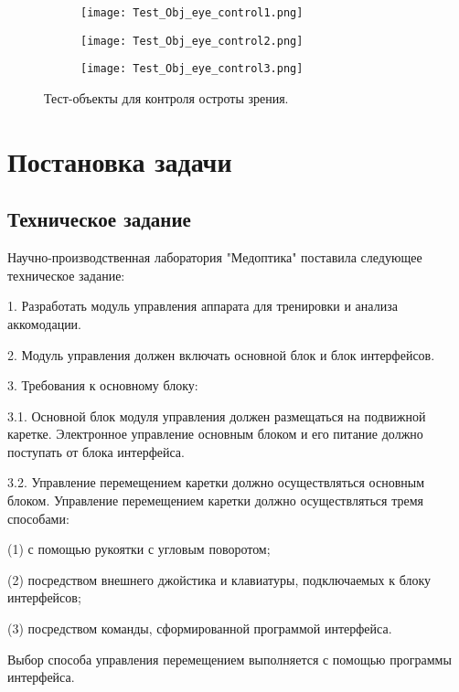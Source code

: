 \begin{figure}[ht]
    \centering
    \begin{subfigure}[b]{0.3\textwidth}
    \centering
        \texttt{[image: Test\_Obj\_eye\_control1.png]}
        \caption{}
    \end{subfigure}
    \begin{subfigure}[b]{0.3\textwidth}
    \centering
        \texttt{[image: Test\_Obj\_eye\_control2.png]}
        \caption{}
    \end{subfigure}
    \begin{subfigure}[b]{0.3\textwidth}
    \centering
        \texttt{[image: Test\_Obj\_eye\_control3.png]}
        \caption{}
    \end{subfigure}
    \caption{ Тест-объекты для контроля остроты зрения.}
    \label{fig:TestObjEC}
\end{figure}

\section{Постановка задачи}
\subsection{Техническое задание}
Научно-производственная лаборатория "Медоптика" поставила следующее техническое задание:

1. Разработать модуль управления аппарата для тренировки и анализа аккомодации.

2. Модуль управления должен включать основной блок и блок интерфейсов.

3. Требования к основному блоку:

3.1. Основной блок модуля управления должен размещаться на подвижной каретке. Электронное управление основным блоком и его питание должно поступать от блока интерфейса.

3.2. Управление перемещением каретки должно осуществляться основным блоком. Управление перемещением каретки должно осуществляться тремя способами:

(1) с помощью рукоятки с угловым поворотом;

(2) посредством внешнего джойстика и клавиатуры, подключаемых к блоку интерфейсов;

(3) посредством команды, сформированной программой интерфейса.

Выбор способа управления перемещением выполняется с помощью программы интерфейса.

